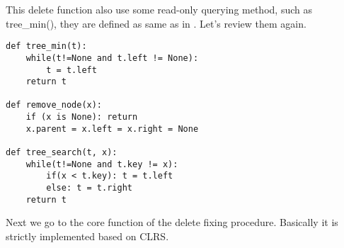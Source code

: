 \documentclass{article}
\begin{document}
This delete function also use some read-only querying method, such as tree\_min(), they are defined
as same as in \cite{bst-lxy}. Let's review them again.

\begin{lstlisting}
def tree_min(t):
    while(t!=None and t.left != None):
        t = t.left
    return t

def remove_node(x):
    if (x is None): return
    x.parent = x.left = x.right = None

def tree_search(t, x):
    while(t!=None and t.key != x):
        if(x < t.key): t = t.left
        else: t = t.right
    return t
\end{lstlisting}

Next we go to the core function of the delete fixing procedure. Basically it is strictly implemented
based on CLRS.
\end{document}
